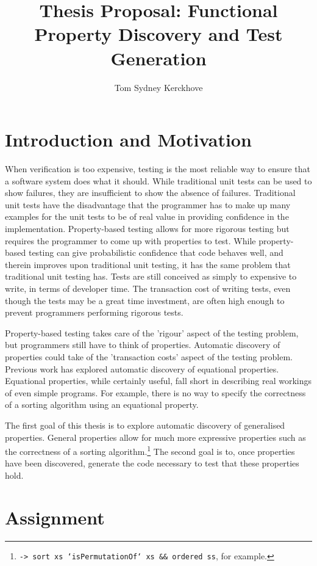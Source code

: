 \documentclass[a4paper, 11pt]{article}
\title{Thesis Proposal: Functional Property Discovery and Test Generation}
\author{Tom Sydney Kerckhove}
\begin{document}
\maketitle

\section{Introduction and Motivation}

When verification is too expensive, testing is the most reliable way to ensure that a software system does what it should.
While traditional unit tests can be used to show failures, they are insufficient to show the absence of failures.
Traditional unit tests have the disadvantage that the programmer has to make up many examples for the unit tests to be of real value in providing confidence in the implementation.
Property-based testing \cite{QuickCheck} allows for more rigorous testing but requires the programmer to come up with properties to test.
While property-based testing can give probabilistic confidence that code behaves well, and therein improves upon traditional unit testing, it has the same problem that traditional unit testing has.
Tests are still conceived as simply to expensive to write, in terms of developer time.
The transaction cost of writing tests, even though the tests may be a great time investment, are often high enough to prevent programmers performing rigorous tests.

Property-based testing takes care of the 'rigour' aspect of the testing problem, but programmers still have to think of properties.
Automatic discovery of properties could take of the 'transaction costs' aspect of the testing problem.
Previous work\cite{QuickSpec} has explored automatic discovery of equational properties.
Equational properties, while certainly useful, fall short in describing real workings of even simple programs.
For example, there is no way to specify the correctness of a sorting algorithm using an equational property.

The first goal of this thesis is to explore automatic discovery of generalised properties.
General properties allow for much more expressive properties such as the correctness of a sorting algorithm.\footnote{\texttt{\xs -> sort xs `isPermutationOf` xs && ordered ss}, for example.}
The second goal is to, once properties have been discovered, generate the code necessary to test that these properties hold.

\section{Assignment}
\end{document}
